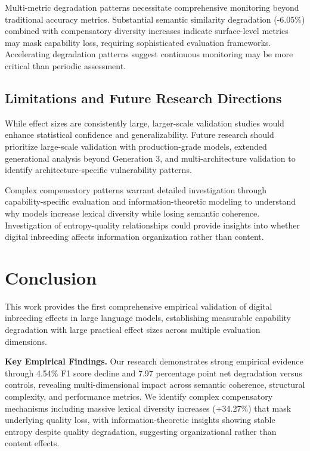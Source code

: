 \documentclass{article}
\begin{document}
Multi-metric degradation patterns necessitate comprehensive monitoring beyond traditional accuracy metrics. Substantial semantic similarity degradation (-6.05\%) combined with compensatory diversity increases indicate surface-level metrics may mask capability loss, requiring sophisticated evaluation frameworks. Accelerating degradation patterns suggest continuous monitoring may be more critical than periodic assessment.

\subsection{Limitations and Future Research Directions}

While effect sizes are consistently large, larger-scale validation studies would enhance statistical confidence and generalizability. Future research should prioritize large-scale validation with production-grade models, extended generational analysis beyond Generation 3, and multi-architecture validation to identify architecture-specific vulnerability patterns.

Complex compensatory patterns warrant detailed investigation through capability-specific evaluation and information-theoretic modeling to understand why models increase lexical diversity while losing semantic coherence. Investigation of entropy-quality relationships could provide insights into whether digital inbreeding affects information organization rather than content.

\section{Conclusion}

This work provides the first comprehensive empirical validation of digital inbreeding effects in large language models, establishing measurable capability degradation with large practical effect sizes across multiple evaluation dimensions.

\textbf{Key Empirical Findings.} Our research demonstrates strong empirical evidence through 4.54\% F1 score decline and 7.97 percentage point net degradation versus controls, revealing multi-dimensional impact across semantic coherence, structural complexity, and performance metrics. We identify complex compensatory mechanisms including massive lexical diversity increases (+34.27\%) that mask underlying quality loss, with information-theoretic insights showing stable entropy despite quality degradation, suggesting organizational rather than content effects.
\end{document}
